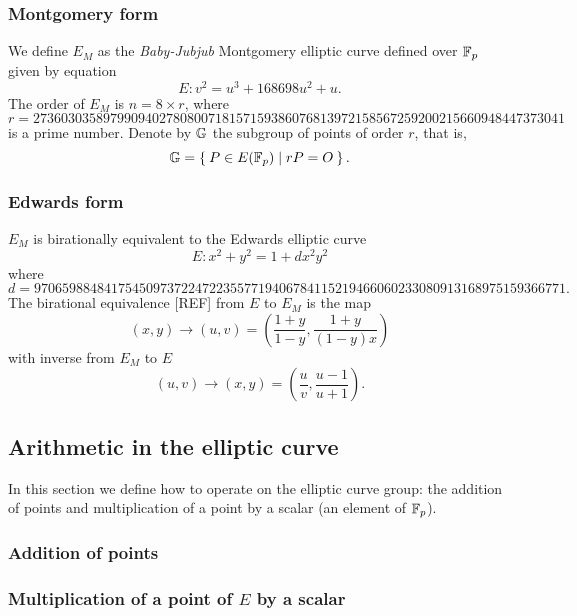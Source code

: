 \documentclass{article}
\begin{document}
\begin{spacing}{1.2}
		\subsubsection{Montgomery form}
		We define $E_M$ as the {\it Baby-Jubjub} Montgomery elliptic curve defined over $\mathbb{F}_p$ given %
		by equation
		$$	E: v^2 = u^3 +  168698u^2 + u. $$
		The order of $E_M$ is $n = 8\times r$, where 
		$$	r = 2736030358979909402780800718157159386076813972
		158567259200215660948447373041 $$ 
		is a prime number. Denote by $\mathbb{G}$ the subgroup of points of order $r$, that is, %
		$$\mathbb{G} = \Set{ P \in E(\ensuremath{\mathbb{F}_p}) | r P = O  }.$$

		\subsubsection{Edwards form}
		$E_M$ is birationally equivalent to the Edwards elliptic curve %
			$$	E: x^2 + y^2 = 1 +  d x^2 y^2 $$
		where
		$ d = 9706598848417545097372247223557719406784115219466060233080913168975159366771.$ \\
		
	
		The birational equivalence [REF] from $E$ to $E_M$ is the map
		$$ (x,y) \to (u,v) = \left( \frac{1 + y}{1 - y} , \frac{1 + y}{(1 - y)x} \right) $$
		with inverse from $E_M$ to $E$
		$$ (u, v) \to (x, y) = \left(  \frac{u}{v}, \frac{u - 1}{u + 1}   \right). $$
		
	\subsection{Arithmetic in the elliptic curve}
	In this section we define how to operate on the elliptic curve group: %
	the addition of points and multiplication of a point by a scalar (an element of $\mathbb{F}_p$).
	 	\subsubsection{Addition of points} 
	 	\subsubsection{Multiplication of a point of $E$ by a scalar} 


\end{spacing}
\end{document}
